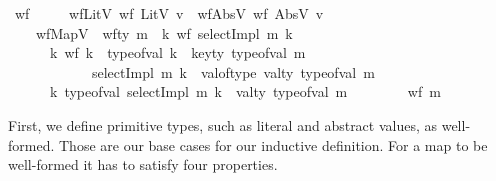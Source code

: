 \documentclass[11pt]{article}
\begin{document}
\begin{isabellebody}
\isanewline
{}\isamarkupfalse%
\ wf\ \isanewline
\ \ \ \ wfLitV{\isacharcolon}{\kern0pt}\ {\isachardoublequoteopen}wf\ {\isacharparenleft}{\kern0pt}LitV\ v{\isacharparenright}{\kern0pt}{\isachardoublequoteclose}\ {\isacharbar}{\kern0pt}\ wfAbsV{\isacharcolon}{\kern0pt}\ {\isachardoublequoteopen}wf\ {\isacharparenleft}{\kern0pt}AbsV\ v{\isacharparenright}{\kern0pt}{\isachardoublequoteclose}\ {\isacharbar}{\kern0pt}\isanewline
\ \ \ \ wfMapV{\isacharcolon}{\kern0pt}\ {\isachardoublequoteopen}{\isasymlbrakk}\ wf{\isacharunderscore}{\kern0pt}ty\ m{\isacharsemicolon}{\kern0pt}\ \ {\isacharparenleft}{\kern0pt}{\isasymforall}k{\isachardot}{\kern0pt}\ wf\ {\isacharparenleft}{\kern0pt}selectImpl\ m\ k{\isacharparenright}{\kern0pt}{\isacharparenright}{\kern0pt}{\isacharsemicolon}{\kern0pt}\isanewline
\ \ \ \ \ \ {\isacharparenleft}{\kern0pt}{\isasymforall}k{\isachardot}{\kern0pt}\ {\isacharparenleft}{\kern0pt}{\isasymnot}wf\ k\ {\isasymor}\ type{\isacharunderscore}{\kern0pt}of{\isacharunderscore}{\kern0pt}val\ k\ {\isasymnoteq}\ key{\isacharunderscore}{\kern0pt}ty\ {\isacharparenleft}{\kern0pt}type{\isacharunderscore}{\kern0pt}of{\isacharunderscore}{\kern0pt}val\ m{\isacharparenright}{\kern0pt}{\isacharparenright}{\kern0pt}\isanewline 
\ \ \ \ \ \ \ \ \ \ \ {\isasymlongrightarrow}\ {\isacharparenleft}{\kern0pt}selectImpl\ m\ k{\isacharparenright}{\kern0pt}\ {\isacharequal}{\kern0pt}\ val{\isacharunderscore}{\kern0pt}of{\isacharunderscore}{\kern0pt}type\ {\isacharparenleft}{\kern0pt}val{\isacharunderscore}{\kern0pt}ty\ {\isacharparenleft}{\kern0pt}type{\isacharunderscore}{\kern0pt}of{\isacharunderscore}{\kern0pt}val\ m{\isacharparenright}{\kern0pt}{\isacharparenright}{\kern0pt}{\isacharparenright}{\kern0pt}{\isacharsemicolon}{\kern0pt}\isanewline
\ \ \ \ \ \ {\isacharparenleft}{\kern0pt}{\isasymforall}k{\isachardot}{\kern0pt}\ type{\isacharunderscore}{\kern0pt}of{\isacharunderscore}{\kern0pt}val\ {\isacharparenleft}{\kern0pt}selectImpl\ m\ k{\isacharparenright}{\kern0pt}\ {\isacharequal}{\kern0pt}\ val{\isacharunderscore}{\kern0pt}ty\ {\isacharparenleft}{\kern0pt}type{\isacharunderscore}{\kern0pt}of{\isacharunderscore}{\kern0pt}val\ m{\isacharparenright}{\kern0pt}{\isacharparenright}{\kern0pt}\isanewline
\ \ \ \ \ \ {\isasymrbrakk}\ {\isasymLongrightarrow}\ wf\ m{\isachardoublequoteclose}
\end{isabellebody}

First, we define primitive types, such as literal and abstract values,
as well-formed.
Those are our base cases for our inductive definition.
For a map to be well-formed it has to satisfy four properties.
\end{document}
